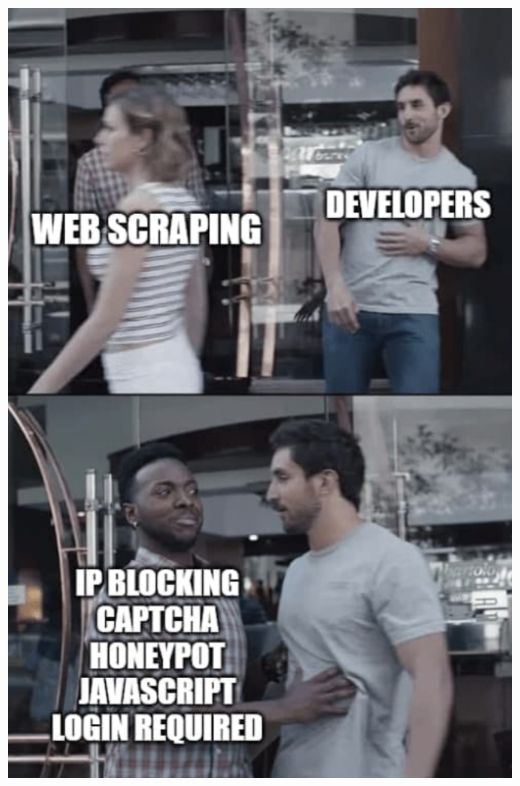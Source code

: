 \documentclass[
10pt, %
aspectratio=169, %
]{beamer}
\begin{document}
	\begin{frame}
		
		\centering
		\includegraphics[height=\paperheight]{meme2.png}
		
	\end{frame}
	
\end{document}
